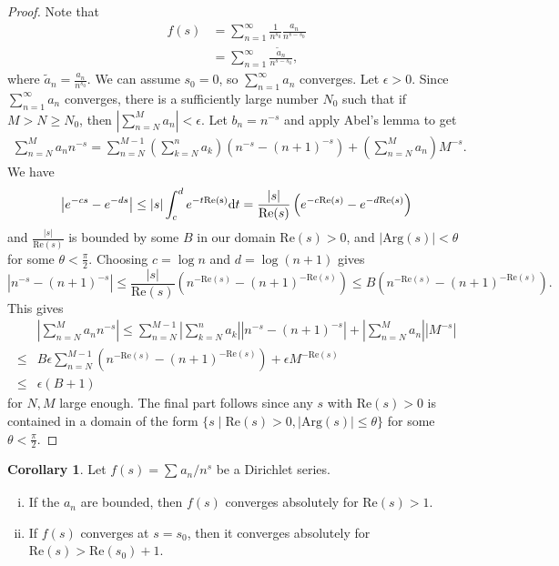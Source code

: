 \documentclass{article}
\theoremstyle{definition}
\newtheorem{cor}[theorem]{Corollary}
\begin{document}
\begin{proof}
    Note that 
    \begin{align*}
        f(s) &= \sum_{n=1}^{\infty} \frac{1}{n^{s_0}}\frac{a_n}{n^{s-s_0}} \\
        &= \sum_{n=1}^{\infty} \frac{\tilde{a}_n}{n^{s-s_0}},
    \end{align*}
    where $\tilde{a}_n = \frac{a_n}{n^{s_0}}$. We can assume $s_0 = 0$, so $\sum_{n=1}^{\infty} a_n$ converges. Let $\epsilon>0$. Since $\sum_{n=1}^{\infty} a_n$ converges, there is a sufficiently large number $N_0$ such that if $M>N\ge N_0$, then $\left|\sum_{n=N}^{M} a_n\right|<\epsilon$. Let $b_n = n^{-s}$ and apply Abel's lemma to get
    \begin{align*}
        \sum_{n=N}^{M} a_n n^{-s} = \sum_{n=N}^{M-1} \left(\sum_{k=N}^{n} a_k\right)\left(n^{-s} - (n+1)^{-s}\right) + \left(\sum_{n=N}^{M} a_n \right)M^{-s}. 
    \end{align*}
    We have 
    \begin{align*}
        \left|e^{-cs}-e^{-ds}\right| \le \left|s\right|\int_{c}^{d} e^{-t \text{\text{Re}(s)}}\mathrm{d}t = \frac{\left|s\right|}{\text{Re}(s)}\left(e^{-c \text{Re}(s)} - e^{-d \text{Re}(s)}\right)
    \end{align*}
    and $\frac{\left|s\right|}{\text{Re}(s)}$ is bounded by some $B$ in our domain $\text{Re}(s)>0$, and $\left|\text{Arg}(s)\right|<\theta$ for some $\theta < \frac{\pi}{2}$. Choosing $c = \log n$ and $d = \log (n+1)$ gives \[
    \left|n^{-s} - (n+1)^{-s}\right| \le \frac{\left|s\right|}{\text{Re}(s)} \left(n^{-\text{Re}(s)} - (n+1)^{-\text{Re}(s)}\right) \le B(n^{-\text{Re}(s)}-(n+1)^{-\text{Re}(s)}).
    \]
    This gives
    \begin{align*}
        &\left|\sum_{n=N}^{M} a_n n^{-s}\right| \le \sum_{n=N}^{M-1} \left|\sum_{k=N}^{n} a_k\right| \left|n^{-s} - (n+1)^{-s}\right| + \left|\sum_{n=N}^{M} a_n\right| \left|M^{-s}\right| \\
        \le & B \epsilon \sum_{n=N}^{M-1} \left(n^{-\text{Re}(s)} - (n+1)^{-\text{Re}(s)}\right) + \epsilon M^{-\text{Re}(s)}\\
        \le & \epsilon(B+1)
    \end{align*}
    for $N,M$ large enough. The final part follows since any $s$ with $\text{Re}(s)>0$ is contained in a domain of the form $\{s \mid \text{Re}(s)>0, \left|\text{Arg}(s)\right|\le \theta\}$ for some $\theta < \frac{\pi}{2}$.
\end{proof}
\begin{cor}\label{cor2.4}
    Let $f(s) =\sum_{}^{} a_n/n^s$ be a Dirichlet series.
    \begin{enumerate}[(i)]
        \item If the $a_n$ are bounded, then $f(s)$ converges absolutely for $\text{Re}(s)>1$.
        \item If $f(s)$ converges at $s=s_0$, then it converges absolutely for $\text{Re}(s)>\text{Re}(s_0)+1$.
    \end{enumerate}
\end{cor}
\end{document}
